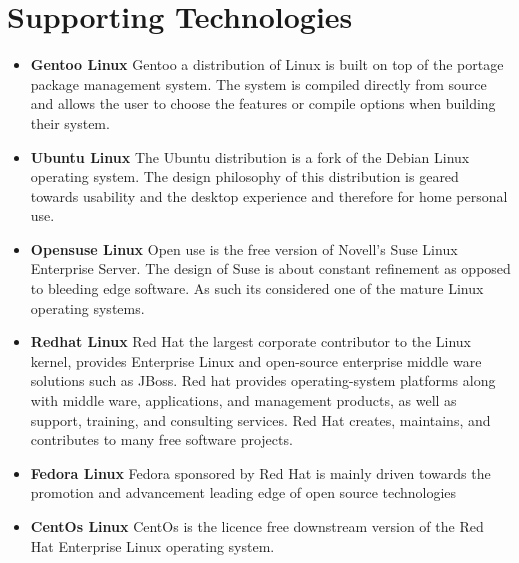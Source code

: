\newpage

\section{Supporting Technologies}
				
	\normalsize
	{			
				
		\begin{itemize}
					
			\item \textbf{Gentoo Linux}
				\newline						
				Gentoo a distribution of Linux is built on top of the portage package management system.  
				The system is compiled directly from source and allows the user to choose the features or compile options when building their system.
							
			\item \textbf{Ubuntu Linux}	
				\newline								
				The Ubuntu distribution is a fork of the Debian Linux operating system.  The design philosophy of
				this distribution is geared towards usability and the desktop experience and therefore for home personal use.
				
			\item \textbf{Opensuse Linux}	
				\newline								
				Open use is the free version of Novell's Suse Linux Enterprise Server.  The design of Suse is about constant refinement as opposed to 
				bleeding edge software.  As such its considered one of the mature Linux operating systems.
				
			\item \textbf{Redhat Linux}		
				\newline							
				Red Hat the largest corporate contributor to the Linux kernel, provides Enterprise Linux and open-source enterprise 
				middle ware solutions such as JBoss. Red hat provides operating-system platforms 
				along with middle ware, applications, and management products, as well as support, training, and consulting services.
				Red Hat creates, maintains, and contributes to many free software projects.
				
			\item \textbf{Fedora Linux}	
				\newline								
				Fedora sponsored by Red Hat is mainly driven towards the promotion and advancement leading edge of open source technologies
				
			\item \textbf{CentOs Linux}	
				\newline								
				CentOs is the licence free downstream version of the Red Hat Enterprise Linux operating system.
						

\end{itemize}}
